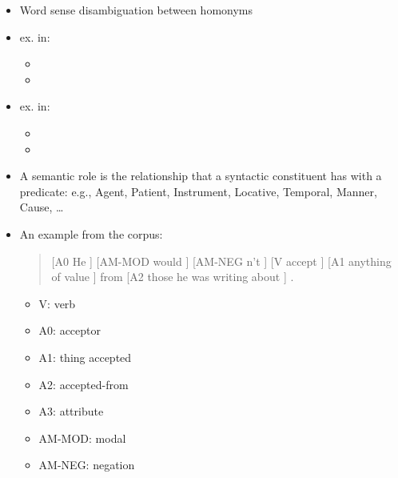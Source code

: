 \documentclass[a4paper,landscape,headrule,footrule,dvips]{foils}
\begin{document}
\begin{CJK}{UTF8}{min}
\begin{itemize}
\item  Word sense disambiguation between homonyms
\item  ex.  in:
  \begin{itemize}
  \item  {}
  \item  {}
  \end{itemize}
\item  ex.  in:
  \begin{itemize}
  \item  {}
  \item  {}
  \end{itemize}
\end{itemize}

\begin{itemize}
\item A semantic role is the relationship that a syntactic constituent
  has with a predicate: e.g., Agent, Patient, Instrument, Locative,
  Temporal, Manner, Cause, \ldots
\item An example from the  corpus:
  \begin{quote}
  [A0 He ] [AM-MOD would ] [AM-NEG n't ] [V accept ] [A1 anything of value ] from [A2 those he was writing about ] . 
  \end{quote}
  \begin{itemize}
  \item V: verb
  \item  A0: acceptor
  \item  A1: thing accepted
  \item  A2: accepted-from
  \item  A3: attribute
  \item  AM-MOD: modal
  \item  AM-NEG: negation 
  \end{itemize}
\end{itemize}



\end{CJK}
\end{document}
